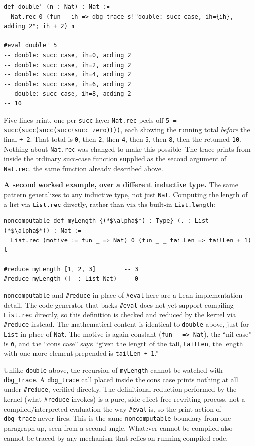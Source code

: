 \begin{lstlisting}
def double' (n : Nat) : Nat :=
  Nat.rec 0 (fun _ ih => dbg_trace s!"double: succ case, ih={ih}, adding 2"; ih + 2) n

#eval double' 5
-- double: succ case, ih=0, adding 2
-- double: succ case, ih=2, adding 2
-- double: succ case, ih=4, adding 2
-- double: succ case, ih=6, adding 2
-- double: succ case, ih=8, adding 2
-- 10
\end{lstlisting}

Five lines print, one per \texttt{succ} layer \texttt{Nat.rec} peels off \texttt{5 = succ(succ(succ(succ(succ zero))))}, each showing the running total \emph{before} the final \texttt{+ 2}. That total is \texttt{0}, then \texttt{2}, then \texttt{4}, then \texttt{6}, then \texttt{8}, then the returned \texttt{10}. Nothing about \texttt{Nat.rec} was changed to make this possible. The trace prints from inside the ordinary succ-case function supplied as the second argument of \texttt{Nat.rec}, the same function already described above.

\textbf{A second worked example, over a different inductive type.} The same pattern generalizes to any inductive type, not just \texttt{Nat}. Computing the length of a list via \texttt{List.rec} directly, rather than via the built-in \texttt{List.length}:

\begin{lstlisting}
noncomputable def myLength {(*$\alpha$*) : Type} (l : List (*$\alpha$*)) : Nat :=
  List.rec (motive := fun _ => Nat) 0 (fun _ _ tailLen => tailLen + 1) l

#reduce myLength [1, 2, 3]        -- 3
#reduce myLength ([] : List Nat)  -- 0
\end{lstlisting}

\texttt{noncomputable} and \texttt{\#reduce} in place of \texttt{\#eval} here are a Lean implementation detail. The code generator that backs \texttt{\#eval} does not yet support compiling \texttt{List.rec} directly, so this definition is checked and reduced by the kernel via \texttt{\#reduce} instead. The mathematical content is identical to \texttt{double} above, just for \texttt{List} in place of \texttt{Nat}. The motive is again constant (\texttt{fun \_\allowbreak{} => Nat}), the ``nil case'' is \texttt{0}, and the ``cons case'' says ``given the length of the tail, \texttt{tailLen}, the length with one more element prepended is \texttt{tailLen + 1}.''

Unlike \texttt{double} above, the recursion of \texttt{myLength} cannot be watched with \texttt{dbg\_\allowbreak{}trace}. A \texttt{dbg\_\allowbreak{}trace} call placed inside the cons case prints nothing at all under \texttt{\#reduce}, verified directly. The definitional reduction performed by the kernel (what \texttt{\#reduce} invokes) is a pure, side-effect-free rewriting process, not a compiled/interpreted evaluation the way \texttt{\#eval} is, so the print action of \texttt{dbg\_\allowbreak{}trace} never fires. This is the same \texttt{noncomputable} boundary from one paragraph up, seen from a second angle. Whatever cannot be compiled also cannot be traced by any mechanism that relies on running compiled code.

